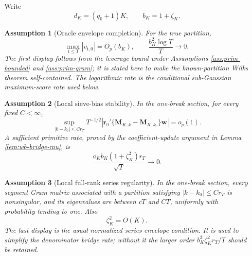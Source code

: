 \documentclass[12pt]{article}
\numberwithin{equation}{section}
\newtheorem{assumption}{Assumption}
\theoremstyle{definition}
\begin{document}
Write
\[
    d_K=(q_0+1)K,
    \qquad b_K=1+\zeta_K.
\]

\begin{assumption}[Oracle envelope completion]
\label{ass:sol-oracle-envelope}
For the true partition,
\[
    \max_{t\leq T}|v_{t,0}|=O_p(b_K),
    \qquad
    \frac{b_K^2\log T}{T}\longrightarrow0.
\]
The first display follows from the leverage bound under Assumptions
\ref{ass:prim-bounded} and \ref{ass:prim-gram}; it is stated here to make the
known-partition Wilks theorem self-contained.  The logarithmic rate is the
conditional sub-Gaussian maximum-score rate used below.
\end{assumption}

\begin{assumption}[Local sieve-bias stability]
\label{ass:sol-local-bias}
In the one-break section, for every fixed \(C<\infty\),
\begin{equation}
    \sup_{|k-k_0|\leq Cr_T}
    T^{-1/2}\left|
      \bm r_0'\{\bm M_{K,k}-\bm M_{K,k_0}\}\bm w
    \right|=o_p(1).
    \label{eq:sol-local-bias}
\end{equation}
A sufficient primitive rate, proved by the coefficient-update argument in
Lemma \ref{lem:wb-bridge-mu}, is
\begin{equation}
    \frac{a_K b_K(1+\zeta_K^2)r_T}{\sqrt T}\longrightarrow0.
    \label{eq:sol-local-bias-sufficient}
\end{equation}
\end{assumption}

\begin{assumption}[Local full-rank series regularity]
\label{ass:sol-local-series}
In the one-break section, every segment Gram matrix associated with a
partition satisfying \(|k-k_0|\leq Cr_T\) is nonsingular, and its eigenvalues
are between \(cT\) and \(CT\), uniformly with probability tending to one.
Also
\begin{equation}
    \zeta_K^2=O(K).
    \label{eq:sol-regular-envelope}
\end{equation}
The last display is the usual normalized-series envelope condition.  It is
used to simplify the denominator bridge rate; without it the larger order
\(b_K^2\zeta_K^2r_T/T\) should be retained.
\end{assumption}
\end{document}
